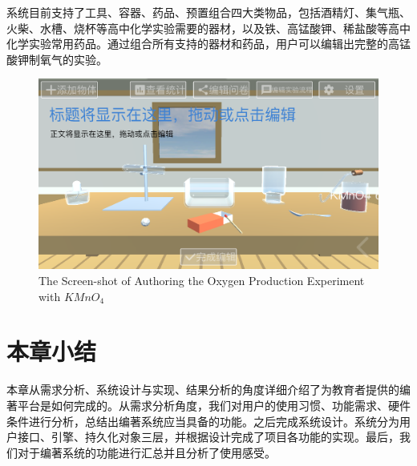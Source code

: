 系统目前支持了工具、容器、药品、预置组合四大类物品，包括酒精灯、集气瓶、火柴、水槽、烧杯等高中化学实验需要的器材，以及铁、高锰酸钾、稀盐酸等高中化学实验常用药品。通过组合所有支持的器材和药品，用户可以编辑出完整的高锰酸钾制氧气的实验。

\begin{figure}[!htp]
  \centering
  \includegraphics[width=12cm]{figure/Kmno4res.png}
    {The Screen-shot of Authoring the Oxygen Production Experiment with $KMnO_4$}
 \label{fig:authorRes}
\end{figure}

\section{本章小结}
本章从需求分析、系统设计与实现、结果分析的角度详细介绍了为教育者提供的编著平台是如何完成的。从需求分析角度，我们对用户的使用习惯、功能需求、硬件条件进行分析，总结出编著系统应当具备的功能。之后完成系统设计。系统分为用户接口、引擎、持久化对象三层，并根据设计完成了项目各功能的实现。最后，我们对于编著系统的功能进行汇总并且分析了使用感受。